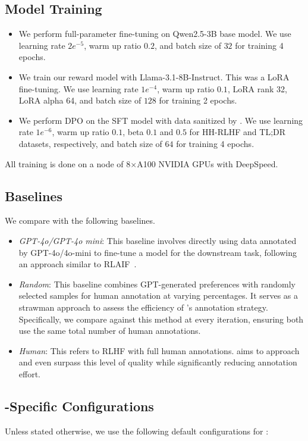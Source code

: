 \subsection{Model Training}
\begin{itemize}[leftmargin=*]
    \item {}
    We perform full-parameter fine-tuning on Qwen2.5-3B base model. We use learning rate $2e^{-5}$, warm up ratio $0.2$, and batch size of $32$ for training 4 epochs.
    \item {} 
    We train our reward model with Llama-3.1-8B-Instruct. This was a LoRA fine-tuning. We use learning rate $1e^{-4}$, warm up ratio $0.1$, LoRA rank 32, LoRA alpha 64, and batch size of $128$ for training 2 epochs. 
    \item {}
    We perform DPO on the SFT model with data sanitized by \myname{}. We use learning rate $1e^{-6}$, warm up ratio $0.1$, beta $0.1$ and $0.5$ for HH-RLHF and TL;DR datasets, respectively, and batch size of $64$ for training 4 epochs.  
\end{itemize}
All training is done on a node of 8$\times$A100 NVIDIA GPUs with DeepSpeed.

\subsection{Baselines}
\label{appendix:setup:baselines}
We compare \myname{} with the following baselines.
\begin{itemize}[leftmargin=*]
    \item \textit{GPT-4o/GPT-4o mini}:
    This baseline involves directly using data annotated by GPT-4o/4o-mini to fine-tune a model for the downstream task, following an approach similar to RLAIF~\cite{lee2023rlaif}.
    \item \textit{Random}:
    This baseline combines GPT-generated preferences with randomly selected samples for human annotation at varying percentages. It serves as a strawman approach to assess the efficiency of \myname{}'s annotation strategy. Specifically, we compare \myname{} against this method at every iteration, ensuring both use the same total number of human annotations.
    \item \textit{Human}:
    This refers to RLHF with full human annotations. \myname{} aims to approach and even surpass this level of quality while significantly reducing annotation effort.
\end{itemize}

\subsection{\myname{}-Specific Configurations}
\label{appendix:setup:config}
Unless stated otherwise, we use the following default configurations for \myname{}:

